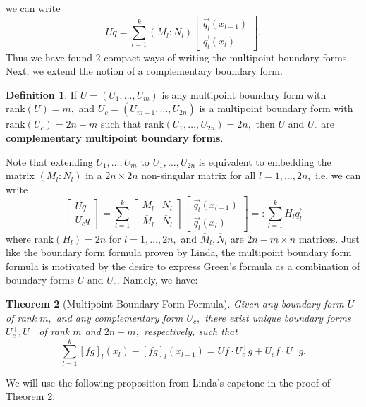 \documentclass[11pt,reqno,oneside,a4paper]{article}
\theoremstyle{plain} %
\newtheorem{theorem}{Theorem}
\theoremstyle{definition}
\newtheorem{definition}[theorem]{Definition}
\theoremstyle{remark}
\begin{document}
we can write 
\[ Uq = \sum^k_{l=1}(M_l:N_l) 
\begin{bmatrix}
\vec{q_l}(x_{l-1})  \\
\vec{q_l}(x_{l})
\end{bmatrix}.
\]
Thus we have found 2 compact ways of writing the multipoint boundary forms. Next, we extend the notion of a complementary boundary form.
\newline
\begin{definition}
If $U = (U_1, \ldots, U_m)$ is any multipoint boundary form with $\mathrm{rank}(U) = m,$ and $U_c = (U_{m+1}, \ldots, U_{2n})$ is a multipoint boundary form with $\mathrm{rank}(U_c) = 2n-m$ such that $\mathrm{rank}(U_{1}, \ldots, U_{2n}) = 2n,$ then $U$ and $U_c$ are \textbf{complementary multipoint boundary forms}. 
\end{definition}
Note that extending $U_1, \ldots, U_m$ to $U_{1}, \ldots, U_{2n}$ is equivalent to embedding the matrix $(M_l :N_l)$ in a $2n \times 2n$ non-singular matrix for all $l = 1, \ldots, 2n,$ i.e. we can write
\[ 
\begin{bmatrix}
Uq \\
U_c q
\end{bmatrix} =
\sum^k_{l=1}
\begin{bmatrix}
M_l & N_l \\
\overline{M}_l & \overline{N}_l 
\end{bmatrix} 
\begin{bmatrix}
\vec{q_l}(x_{l-1})  \\
\vec{q_l}(x_{l})
\end{bmatrix} 
=: 
\sum^k_{l=1}
H_l \vec{q_l}
\]
where $\mathrm{rank}(H_l) = 2n$ for $l = 1, \ldots, 2n,$ and $\overline{M}_l, \overline{N}_l$ are $2n-m \times n$ matrices. Just like the boundary form formula proven by Linda, the multipoint boundary form formula is motivated by the desire to express Green's formula as a combination of boundary forms $U$ and $U_c.$ Namely, we have:
\newline
\begin{theorem}[Multipoint Boundary Form Formula]\label{mbff}
Given any boundary form $U$ of rank $m,$ and any complementary form $U_c,$ there exist unique boundary forms $U^+_c, U^+$ of rank $m$ and $2n-m,$ respectively, such that
\[ 
\sum_{l=1}^{k} [fg]_l(x_l) - [fg]_l(x_{l-1}) = Uf\cdot U^+_c g + U_c f \cdot U^+ g.
\]
\end{theorem}
We will use the following proposition from Linda's capstone \cite{linfan} in the proof of Theorem \ref{mbff}:
\newline
\end{document}
